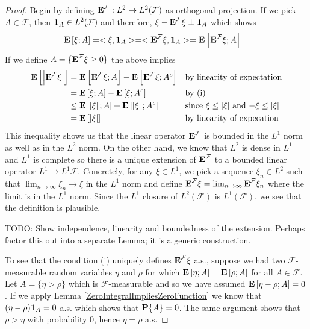 \begin{proof}
Begin by defining $\textbf{E}^\mathcal{F} : L^2 \to
L^2(\mathcal{F})$ as orthogonal projection.  If we pick $A \in
\mathcal{F}$, then $\textbf{1}_{A} \in L^2(\mathcal{F})$ and
therefore, $\xi - \textbf{E}^{\mathcal{F}} \xi \perp
\textbf{1}_{A}$ which shows
\begin{align*}
\textbf{E}\left[\xi ; A\right] &= <\xi, \textbf{1}_{A}> =
<\textbf{E}^{\mathcal{F}} \xi, \textbf{1}_{A}> =
\textbf{E}\left[\textbf{E}^{\mathcal{F}} \xi ; A\right]
\end{align*}
If we define $A = \lbrace \textbf{E}^{\mathcal{F}} \xi \geq 0
\rbrace$ the above implies
\begin{align*}
\textbf{E}\left[\left \vert \textbf{E}^{\mathcal{F}} \xi \right \vert\right] &=
\textbf{E}\left[\textbf{E}^{\mathcal{F}} \xi ; A\right] -
\textbf{E}\left[\textbf{E}^{\mathcal{F}} \xi ; A^c\right] & & \text{by
  linearity of expectation}\\
&= \textbf{E}\left[\xi ; A\right] - \textbf{E}\left[\xi ; A^c\right] & &\text{by (i)} \\
&\leq \textbf{E}\left[\left \vert \xi \right \vert; A\right] + \textbf{E}\left[\left \vert \xi \right \vert; A^c\right] & &
\text{since $\xi \leq \left \vert \xi \right \vert$ and 
  $-\xi \leq \left \vert \xi \right \vert$} \\
&= \textbf{E}\left[\left \vert \xi \right \vert\right] & & \text{by linearity of expecation}
\end{align*}
This inequality shows us that the linear operator
$\textbf{E}^\mathcal{F}$ is bounded in the $L^1$ norm as well as
in the $L^2$ norm.  On the other hand, we know that $L^2$ is dense in
$L^1$ and $L^1$ is complete so there is a unique extension of $\textbf{E}^\mathcal{F}$
to a bounded linear operator $L^1 \to L^1{\mathcal{F}}$.  Concretely,
for any $\xi \in L^1$, we pick a sequence $\xi_n \in L^2$ such that
$\lim_{n \to \infty} \xi_n \to \xi$ in the $L^1$ norm and define
$\textbf{E}^{\mathcal{F}} \xi = \lim_{n \to \infty}
\textbf{E}^{\mathcal{F}} \xi_n$ where the limit is in the $L^1$
norm.  Since the $L^1$ closure of $L^2(\mathcal{F})$ is
$L^1(\mathcal{F})$, we see that the definition is plausible.  

TODO: Show independence, linearity and boundedness of the extension.
Perhaps factor this out into a separate Lemma; it is a generic
construction.

To see that the condition (i) uniquely defines
$\textbf{E}^{\mathcal{F}} \xi $ a.s., suppose we had two
$\mathcal{F}$-measurable random variables $\eta$ and $\rho$ for which
$\textbf{E}\left[\eta ; A\right] = \textbf{E}\left[\rho ; A\right]$ for all $A \in
\mathcal{F}$.  Let $A = \lbrace \eta > \rho \rbrace$ which is
$\mathcal{F}$-measurable and so we have assumed
$\textbf{E}\left[\eta - \rho ; A\right] = 0$.  If we apply Lemma \ref{ZeroIntegralImpliesZeroFunction} we
know that $(\eta - \rho)\textbf{1}_{A} = 0$ a.s. which shows that
$\textbf{P}\{A\} = 0$.   The same argument shows that
$\rho > \eta$ with probability $0$, hence $\eta = \rho$ a.s.


\end{proof}
